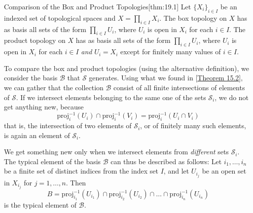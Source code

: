 \begin{thmBox}{Comparison of the Box and Product Topologies}[thm:19.1]
    Let \( \{ X_{ i } \}_{ i \in I } \) be an indexed set of topological spaces
    and \( X = \prod_{ i \in I } X_{ i } \).
    The box topology on \( X \) has as basis all sets of the form 
    \( \prod_{ i \in I } U_{ i } \), where \( U_{ i } \) is open in 
    \( X_{ i } \) for each \( i \in I \).
    The product topology on \( X \) has as basis all sets of the form 
    \( \prod_{ i \in I } U_{ i } \), where \( U_{ i } \) is open in 
    \( X_{ i } \) for each \( i \in I \) \textit{and} \( U_{ i } = X_{ i } \)
    except for finitely many values of \( i \in I \).

    \baseRule

    \begin{proofBox}
        To compare the box and product topologies (using the alternative 
        definition), we consider the basis \( \mathcal{B} \) that 
        \( \mathcal{S} \) generates.
        Using what we found in [\hyperlink{thm:15.2}{Theorem 15.2}], we can 
        gather that the collection \( \mathcal{B} \) consist of all finite 
        intersections of elements of \( \mathcal{S} \).
        If we intersect elements belonging to the same one of the sets 
        \( \mathcal{S}_{ i } \), we do not get anything new, because 
        \begin{equation*}
            \mathrm{proj}_{ i }^{ -1 } ( U_{ i } )
            \cap 
            \mathrm{proj}_{ i }^{ -1 } ( V_{ i } )
            =
            \mathrm{proj}_{ i }^{ -1 } ( U_{ i } \cap V_{ i } )
        \end{equation*}
        that is, the intersection of two elements of \( \mathcal{S}_{ i } \), 
        or of finitely many such elements, is again an element of 
        \( \mathcal{S}_{ i } \).

        \baseSkip 

        We get something new only when we intersect elements from 
        \textit{different} sets \( \mathcal{S}_{ i } \).
        The typical element of the basis \( \mathcal{B} \) can thus be 
        described as follows: Let \( i_{ 1 } , \ldots , i_{ n } \) be a finite
        set of distinct indices from the index set \( I \), and let 
        \( U_{ i_{ j } } \) be an open set in \( X_{ i_{ j } } \) for 
        \( j = 1 , \ldots , n \).
        Then 
        \begin{equation*}
            B
            =
            \mathrm{proj}_{ i_{ 1 } }^{ -1 } ( U_{ i_{ 1 } } )
            \cap 
            \mathrm{proj}_{ i_{ 2 } }^{ -1 } ( U_{ i_{ 2 } } )
            \cap \ldots \cap 
            \mathrm{proj}_{ i_{ n } }^{ -1 } ( U_{ i_{ n } } )
        \end{equation*}
        is the typical element of \( \mathcal{B} \).


\end{proofBox}
\end{thmBox}
